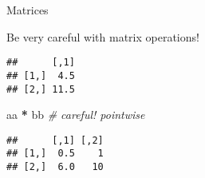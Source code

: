 \documentclass[ignorenonframetext,]{beamer}
\newenvironment{Shaded}{\begin{snugshade}}{\end{snugshade}}
\newcommand{\CommentTok}[1]{\textcolor[rgb]{0.56,0.35,0.01}{\textit{#1}}}
\newcommand{\NormalTok}[1]{#1}
\newcommand{\OperatorTok}[1]{\textcolor[rgb]{0.81,0.36,0.00}{\textbf{#1}}}
\newcommand{\StringTok}[1]{\textcolor[rgb]{0.31,0.60,0.02}{#1}}
\begin{document}
\begin{frame}[fragile]{Matrices}
\protect\hypertarget{matrices-2}{}

Be very careful with matrix operations!

\begin{Shaded}
\end{Shaded}

\begin{verbatim}
##      [,1]
## [1,]  4.5
## [2,] 11.5
\end{verbatim}

\begin{Shaded}
\begin{Highlighting}[]
\NormalTok{aa }\OperatorTok{*}\StringTok{ }\NormalTok{bb }\CommentTok{# careful! pointwise}
\end{Highlighting}
\end{Shaded}

\begin{verbatim}
##      [,1] [,2]
## [1,]  0.5    1
## [2,]  6.0   10
\end{verbatim}

\end{frame}
\end{document}
